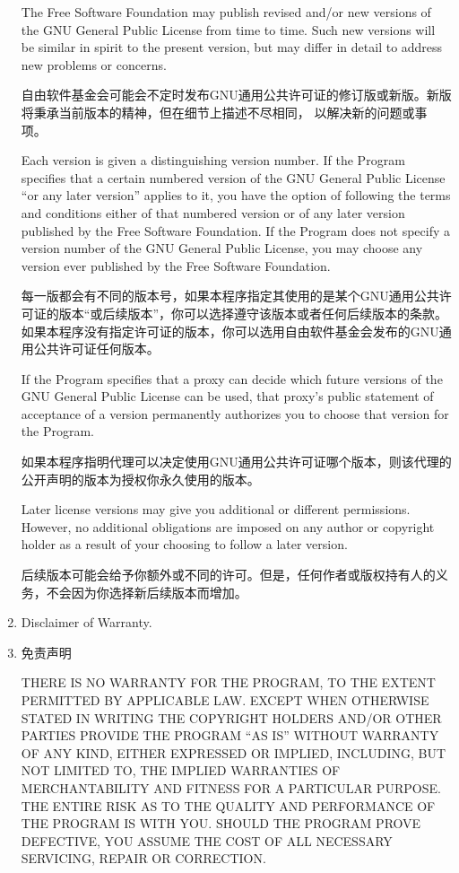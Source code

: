 \documentclass[11pt]{article}
\begin{document}
\begin{enumerate}
        The Free Software Foundation may publish revised and/or new versions of
        the GNU General Public License from time to time.  Such new versions will
        be similar in spirit to the present version, but may differ in detail to
        address new problems or concerns.

        自由软件基金会可能会不定时发布GNU通用公共许可证的修订版或新版。新版将秉承当前版本的精神，但在细节上描述不尽相同，
        以解决新的问题或事项。

        Each version is given a distinguishing version number.  If the
        Program specifies that a certain numbered version of the GNU General
        Public License ``or any later version'' applies to it, you have the
        option of following the terms and conditions either of that numbered
        version or of any later version published by the Free Software
        Foundation.  If the Program does not specify a version number of the
        GNU General Public License, you may choose any version ever published
        by the Free Software Foundation.

        每一版都会有不同的版本号，如果本程序指定其使用的是某个GNU通用公共许可证的版本“或后续版本”，你可以选择遵守该版本或者任何后续版本的条款。
        如果本程序没有指定许可证的版本，你可以选用自由软件基金会发布的GNU通用公共许可证任何版本。

        If the Program specifies that a proxy can decide which future
        versions of the GNU General Public License can be used, that proxy's
        public statement of acceptance of a version permanently authorizes you
        to choose that version for the Program.

        如果本程序指明代理可以决定使用GNU通用公共许可证哪个版本，则该代理的公开声明的版本为授权你永久使用的版本。

        Later license versions may give you additional or different
        permissions.  However, no additional obligations are imposed on any
        author or copyright holder as a result of your choosing to follow a
        later version.

        后续版本可能会给予你额外或不同的许可。但是，任何作者或版权持有人的义务，不会因为你选择新后续版本而增加。

  \item Disclaimer of Warranty.
  \item 免责声明

        \begin{sloppypar}
          THERE IS NO WARRANTY FOR THE PROGRAM, TO THE EXTENT PERMITTED BY
          APPLICABLE LAW.  EXCEPT WHEN OTHERWISE STATED IN WRITING THE
          COPYRIGHT HOLDERS AND/OR OTHER PARTIES PROVIDE THE PROGRAM ``AS IS''
          WITHOUT WARRANTY OF ANY KIND, EITHER EXPRESSED OR IMPLIED,
          INCLUDING, BUT NOT LIMITED TO, THE IMPLIED WARRANTIES OF
          MERCHANTABILITY AND FITNESS FOR A PARTICULAR PURPOSE.  THE ENTIRE
          RISK AS TO THE QUALITY AND PERFORMANCE OF THE PROGRAM IS WITH YOU.
          SHOULD THE PROGRAM PROVE DEFECTIVE, YOU ASSUME THE COST OF ALL
          NECESSARY SERVICING, REPAIR OR CORRECTION.


\end{sloppypar}
\end{enumerate}
\end{document}
